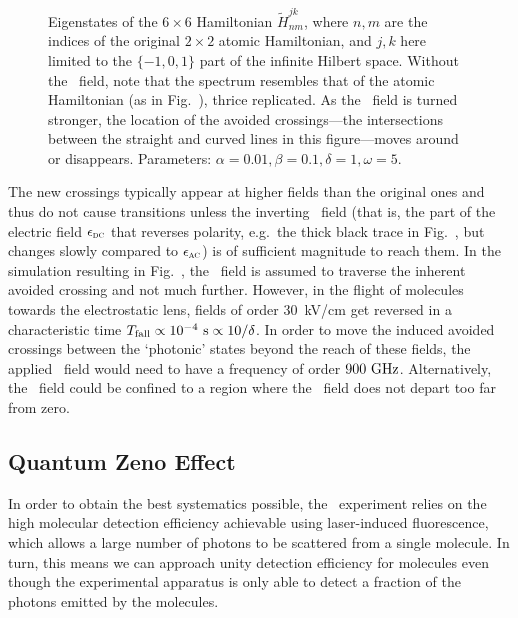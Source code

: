 \begin{figure}
    \caption[Floquet eigenstates.]{Eigenstates of the $6\times6$ Hamiltonian
    $\widetilde{H}_{nm}^{jk}$, where $n,m$ are the indices of the original
    $2\times2$ atomic Hamiltonian, and $j,k$ here limited to the $\{-1,0,1\}$
    part of the infinite Hilbert space. Without the \AC\ field, note that the
    spectrum resembles that of the atomic Hamiltonian (as in
    Fig.~), thrice replicated. As the \AC\ field is turned
    stronger, the location of the avoided crossings---the intersections between
    the straight and curved lines in this figure---moves around or disappears.
    Parameters: $\alpha=0.01,\beta=0.1,\delta=1,\omega=5$.}
    \label{dressed}
\end{figure}

The new crossings typically appear at higher fields than the original ones and
thus do not cause transitions unless the inverting \DC\ field (that is, the part
of the electric field $\epsilon_\text{\textsc{dc}}$ that reverses polarity, e.g.\ the
thick black trace in Fig.~, but changes slowly compared to
$\epsilon_\text{\textsc{ac}}$) is of sufficient magnitude to reach them. In the
simulation resulting in Fig.~, the \DC\ field is assumed to
traverse the inherent avoided crossing and not much further.  However, in the
flight of molecules towards the electrostatic lens, fields of order 30~kV/cm
get reversed in a characteristic time
$T_\text{fall}\propto10^{-4}~\mathrm{s}\propto10/\delta$. In order to move the induced
avoided crossings between the `photonic' states beyond the reach of these
fields, the applied \AC\ field would need to have a frequency of order
$900~\mathrm{GHz}$. Alternatively, the \AC\ field could be confined to a region where the
\DC\ field does not depart too far from zero.

\subsection{Quantum Zeno Effect}

In order to obtain the best systematics possible, the \CENTREX\ experiment
relies on the high molecular detection efficiency achievable using laser-induced
fluorescence, which allows a large number of photons to be scattered from a
single molecule. In turn, this means we can approach unity detection efficiency
for molecules even though the experimental apparatus is only able to detect a
fraction of the photons emitted by the molecules.

